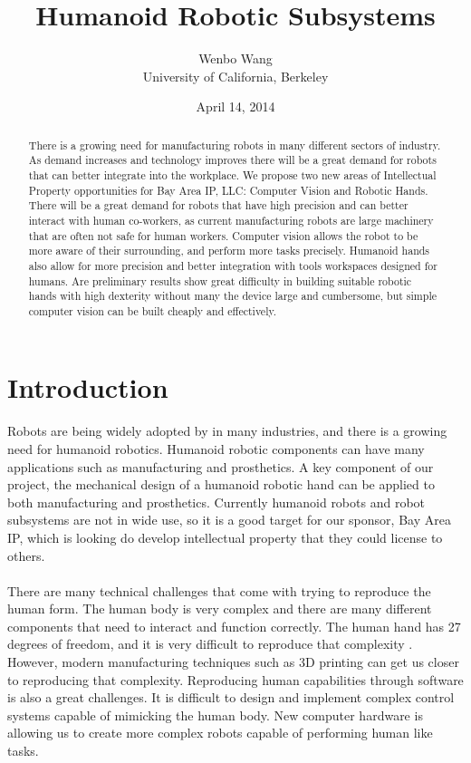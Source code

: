 \documentclass[letterpaper,12pt]{article}
\title{Humanoid Robotic Subsystems}
\date{April 14, 2014}
\author{Wenbo Wang \\University of California, Berkeley}
\begin{document}
\maketitle

\begin{abstract}
There is a growing need for manufacturing robots in many different sectors of
industry. As demand increases and technology improves there will be a great
demand for robots that can better integrate into the workplace. We propose two
new areas of Intellectual Property opportunities for Bay Area IP, LLC: Computer
Vision and Robotic Hands. There will be a great demand for robots that have high
precision and can better interact with human co-workers, as current
manufacturing robots are large machinery that are often not safe for human
workers. Computer vision allows the robot to be more aware of their surrounding,
and perform more tasks precisely. Humanoid hands also allow for more precision
and better integration with tools workspaces designed for humans. Are
preliminary results show great difficulty in building suitable robotic hands
with high dexterity without many the device large and cumbersome, but simple
computer vision can be built cheaply and effectively.  
\end{abstract}

\section{Introduction}
\paragraph{}Robots are being widely adopted by in many industries, and there is
a growing need for humanoid robotics. Humanoid robotic components can have many
applications such as manufacturing and prosthetics. A key component of our
project, the mechanical design of a humanoid robotic hand can be applied to both
manufacturing and prosthetics. Currently humanoid robots and robot subsystems
are not in wide use, so it is a good target for our sponsor, Bay Area IP, which
is looking do develop intellectual property that they could license to others.

\paragraph{}There are many technical challenges that come with trying to
reproduce the human form. The human body is very complex and there are many
different components that need to interact and function correctly. The human
hand has 27 degrees of freedom, and it is very difficult to reproduce that
complexity \cite{ElKoura2003}. However, modern manufacturing techniques such as
3D printing can get us closer to reproducing that complexity. Reproducing human
capabilities through software is also a great challenges. It is difficult to
design and implement complex control systems capable of mimicking the human
body. New computer hardware is allowing us to create more complex robots capable
of performing human like tasks.
\end{document}
